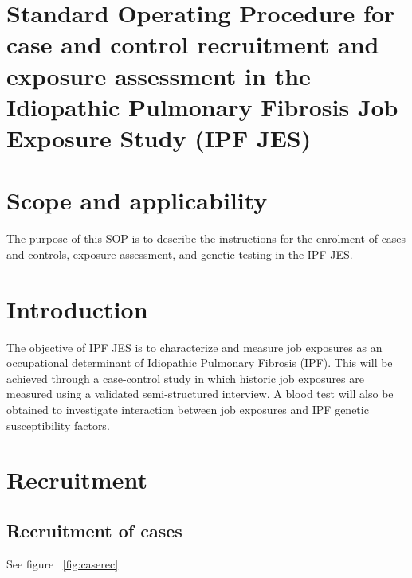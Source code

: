 \documentclass[a4paper,10pt]{article}
\begin{document}
 
 
 \pagestyle{fancy}
 
 


\section*{Standard Operating Procedure for case and control recruitment and exposure assessment in the Idiopathic Pulmonary Fibrosis Job Exposure Study (IPF JES)}

\tableofcontents

\section{Scope and applicability}

The purpose of this SOP is to describe the instructions for the enrolment of cases and controls, exposure assessment, and genetic testing in the IPF JES.

\section{Introduction}

The objective of IPF JES is to characterize and measure job exposures as an occupational determinant of Idiopathic Pulmonary Fibrosis (IPF). This will be achieved through a case-control study in which historic job exposures are measured using a validated semi-structured interview. A blood test will also be obtained to investigate interaction between job exposures and IPF genetic susceptibility factors.   

\section{Recruitment}

\subsection{Recruitment of cases}

See figure ~\ref{fig:caserec}
\end{document}
